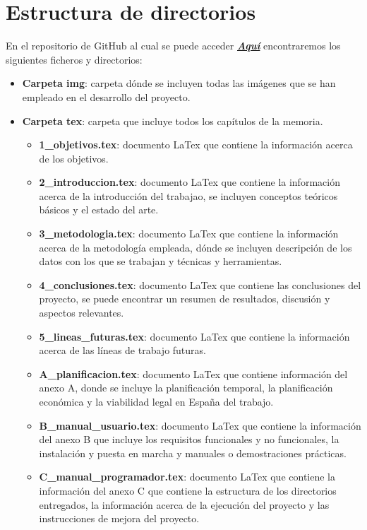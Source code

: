 
\section{Estructura de directorios}

En el repositorio de GitHub al cual se puede acceder \href{https://github.com/NaiaraGadea/TFG_DispositivoDeControlPostural}{\textbf{\textit{Aquí}}} encontraremos los siguientes ficheros y directorios:
\begin{itemize}
    \item \textbf{Carpeta img}: carpeta dónde se incluyen todas las imágenes que se han empleado en el desarrollo del proyecto.
    \item \textbf{Carpeta tex}: carpeta que incluye todos los capítulos de la memoria.
    \begin{itemize}
        \item \textbf{1\_objetivos.tex}: documento LaTex que contiene la información acerca de los objetivos.
        \item \textbf{2\_introduccion.tex}: documento LaTex que contiene la información acerca de la introducción del trabajao, se incluyen conceptos teóricos básicos y el estado del arte.
        \item \textbf{3\_metodologia.tex}: documento LaTex que contiene la información acerca de la metodología empleada, dónde se incluyen descripción de los datos con los que se trabajan y técnicas y herramientas. 
        \item \textbf{4\_conclusiones.tex}: documento LaTex que contiene las conclusiones del proyecto, se puede encontrar un resumen de resultados, discusión y aspectos relevantes.
        \item \textbf{5\_lineas\_futuras.tex}: documento LaTex que contiene la información acerca de las líneas de trabajo futuras.
        \item \textbf{A\_planificacion.tex}: documento LaTex que contiene información del anexo A, donde se incluye la planificación temporal, la planificación económica y la viabilidad legal en España del trabajo.
        \item \textbf{B\_manual\_usuario.tex}: documento LaTex que contiene la información del anexo B que incluye los requisitos funcionales y no funcionales, la instalación y puesta en marcha y manuales o demostraciones prácticas.
        \item \textbf{C\_manual\_programador.tex}: documento LaTex que contiene la información del anexo C que contiene la estructura de los directorios entregados, la información acerca de la ejecución del proyecto y las instrucciones de mejora del proyecto.

\end{itemize}
\end{itemize}
